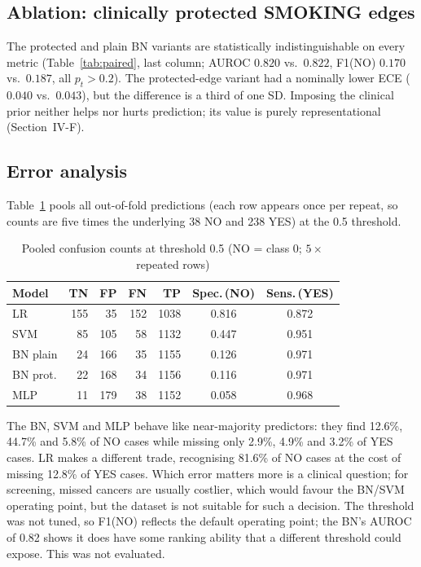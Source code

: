 \documentclass[10pt,twocolumn,letterpaper]{article}
\renewcommand{\_}{\textunderscore\hspace{0pt}}
\begin{document}
\subsection{Ablation: clinically protected SMOKING edges}
The protected and plain BN variants are statistically indistinguishable on every metric (Table~\ref{tab:paired}, last column; AUROC $0.820$ vs.\ $0.822$, F1(NO) $0.170$ vs.\ $0.187$, all $p_t>0.2$). The protected-edge variant had a nominally lower ECE ($0.040$ vs.\ $0.043$), but the difference is a third of one SD. Imposing the clinical prior neither helps nor hurts prediction; its value is purely representational (Section~IV-F).

\subsection{Error analysis}
Table~\ref{tab:cm} pools all out-of-fold predictions (each row appears once per repeat, so counts are five times the underlying 38 NO and 238 YES) at the 0.5 threshold.

\begin{table}[t]
\centering
\caption{Pooled confusion counts at threshold 0.5 (NO = class 0; $5\times$ repeated rows)}
\label{tab:cm}
\scriptsize
\setlength{\tabcolsep}{4pt}
\begin{tabular}{@{}lrrrrcc@{}}
\toprule
Model & TN & FP & FN & TP & Spec.\,(NO) & Sens.\,(YES)\\
\midrule
LR & 155 & 35 & 152 & 1038 & 0.816 & 0.872\\
SVM & 85 & 105 & 58 & 1132 & 0.447 & 0.951\\
BN plain & 24 & 166 & 35 & 1155 & 0.126 & 0.971\\
BN prot. & 22 & 168 & 34 & 1156 & 0.116 & 0.971\\
MLP & 11 & 179 & 38 & 1152 & 0.058 & 0.968\\
\bottomrule
\end{tabular}
\end{table}

The BN, SVM and MLP behave like near-majority predictors: they find 12.6\%, 44.7\% and 5.8\% of NO cases while missing only 2.9\%, 4.9\% and 3.2\% of YES cases. LR makes a different trade, recognising 81.6\% of NO cases at the cost of missing 12.8\% of YES cases. Which error matters more is a clinical question; for screening, missed cancers are usually costlier, which would favour the BN/SVM operating point, but the dataset is not suitable for such a decision. The threshold was not tuned, so F1(NO) reflects the default operating point; the BN's AUROC of 0.82 shows it does have some ranking ability that a different threshold could expose. This was not evaluated.
\end{document}
